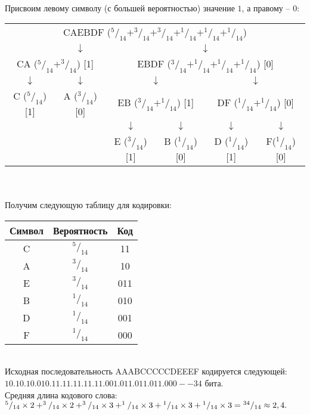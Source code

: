 \\Присвоим левому символу (с большей вероятностью) значение $1$, а правому -- $0$:
\begin{table}[h]
\centering
\begin{tabular}{c c c c c c}
\multicolumn{6}{c}{CAEBDF ($^5/_{14} + ^3/_{14} + ^3/_{14} + ^1/_{14} + ^1/_{14} + ^1/_{14}$)} \\
& $\downarrow$ & \multicolumn{4}{c}{$\downarrow$} \\
\multicolumn{2}{c}{CA ($^5/_{14} + ^3/_{14}$) [1]} & \multicolumn{4}{c}{EBDF ($^3/_{14} + ^1/_{14} + ^1/_{14} + ^1/_{14}$) [0]} \\
$\downarrow$ & $\downarrow$ & \multicolumn{2}{c}{$\downarrow$} & \multicolumn{2}{c}{$\downarrow$} \\
C ($^5/_{14}$) [1] & A ($^3/_{14}$) [0] & \multicolumn{2}{c}{EB ($^3/_{14} + ^1/_{14}$) [1]} & \multicolumn{2}{c}{DF ($^1/_{14} + ^1/_{14}$) [0]} \\
 & & $\downarrow$ & $\downarrow$ & $\downarrow$ & $\downarrow$ \\
 & & E ($^3/_{14}$) [1] & B ($^1/_{14}$) [0] & D ($^1/_{14}$) [1] & F($^1/_{14}$) [0] \\
\end{tabular}
\end{table}
\\
\\Получим следующую таблицу для кодировки:
\begin{table}[h]
\begin{tabular}{|c|c|c|}
\hline
Символ & Вероятность & Код \\
\hline
C & $^5/_{14}$ & 11 \\
A & $^3/_{14}$ & 10 \\
E & $^3/_{14}$ & 011 \\
B & $^1/_{14}$ & 010 \\
D & $^1/_{14}$ & 001 \\
F & $^1/_{14}$ & 000 \\
\hline
\end{tabular}
\end{table}
\\Исходная последовательность AAABCCCCCDEEEF кодируется следующей: $10.10.10.010.11.11.11.11.11.001.011.011.011.000 -- 34$ бита.
\\Средняя длина кодового слова: $^5/_{14}\times 2 + ^3/_{14}\times 2 + ^3/_{14}\times 3 + ^1/_{14}\times 3\hm + ^1/_{14}\hm\times 3\hm + ^1/_{14}\hm\times 3\hm = ^{34}/_{14} \approx 2,4.$
